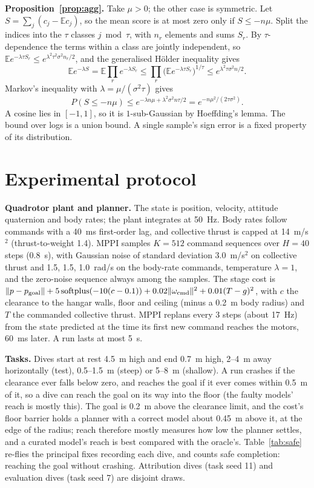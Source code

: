 \documentclass[preprint,12pt]{elsarticle}
\newcommand{\E}{\mathbb{E}}
\begin{document}
\textbf{Proposition~\ref{prop:agg}.} Take $\mu>0$; the other case is symmetric. Let $S=\sum_j(c_j-\E c_j)$, so the mean score is at most zero only if $S\le-n\mu$. Split the indices into the $\tau$ classes $j\bmod\tau$, with $n_r$ elements and sums $S_r$. By $\tau$-dependence the terms within a class are jointly independent, so $\E e^{-\lambda\tau S_r}\le e^{\lambda^2\tau^2\sigma^2n_r/2}$, and the generalised H\"older inequality gives
\begin{equation*}
\E e^{-\lambda S}=\E\prod_re^{-\lambda S_r}\le\prod_r\big(\E e^{-\lambda\tau S_r}\big)^{1/\tau}\le e^{\lambda^2\tau\sigma^2n/2}.
\end{equation*}
 Markov's inequality with $\lambda=\mu/(\sigma^2\tau)$ gives
\begin{equation*}
P(S\le-n\mu)\le e^{-\lambda n\mu+\lambda^2\sigma^2n\tau/2}=e^{-n\mu^2/(2\tau\sigma^2)}.
\end{equation*}
 A cosine lies in $[-1,1]$, so it is $1$-sub-Gaussian by Hoeffding's lemma. The bound over logs is a union bound. A single sample's sign error is a fixed property of its distribution.

\section{Experimental protocol}\label{app:protocol}

\textbf{Quadrotor plant and planner.} The state is position, velocity, attitude quaternion and body rates; the plant integrates at 50~Hz. Body rates follow commands with a 40~ms first-order lag, and collective thrust is capped at 14~m/s$^2$ (thrust-to-weight 1.4). MPPI samples $K=512$ command sequences over $H=40$ steps (0.8~s), with Gaussian noise of standard deviation 3.0~m/s$^2$ on collective thrust and 1.5, 1.5, 1.0~rad/s on the body-rate commands, temperature $\lambda=1$, and the zero-noise sequence always among the samples. The stage cost is $\|p-p_{\rm goal}\|+5\,\mathrm{softplus}(-10(c-0.1))+0.02\|\omega_{\rm cmd}\|^2+0.01(T-g)^2$, with $c$ the clearance to the hangar walls, floor and ceiling (minus a 0.2~m body radius) and $T$ the commanded collective thrust. MPPI replans every 3 steps (about 17~Hz) from the state predicted at the time its first new command reaches the motors, 60~ms later. A run lasts at most 5~s.

\textbf{Tasks.} Dives start at rest 4.5~m high and end 0.7~m high, 2--4~m away horizontally (test), 0.5--1.5~m (steep) or 5--8~m (shallow). A run crashes if the clearance ever falls below zero, and reaches the goal if it ever comes within 0.5~m of it, so a dive can reach the goal on its way into the floor (the faulty models' reach is mostly this). The goal is 0.2~m above the clearance limit, and the cost's floor barrier holds a planner with a correct model about 0.45~m above it, at the edge of the radius; reach therefore mostly measures how low the planner settles, and a curated model's reach is best compared with the oracle's. Table~\ref{tab:safe} re-flies the principal fixes recording each dive, and counts safe completion: reaching the goal without crashing. Attribution dives (task seed 11) and evaluation dives (task seed 7) are disjoint draws.
\end{document}
